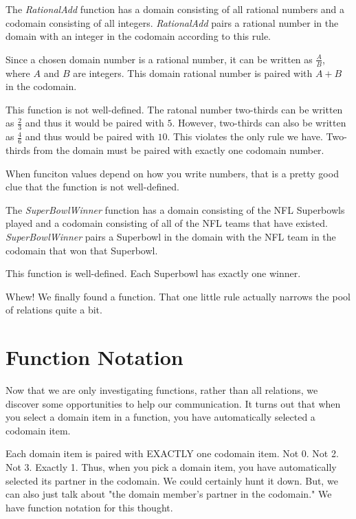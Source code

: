 \documentclass{ximera}
\begin{document}
\begin{example}
The \textit{RationalAdd} function has a domain consisting of all rational numbers and a codomain consisting of all integers.  \textit{RationalAdd} pairs a rational number in the domain with an integer in the codomain according to this rule.

Since a chosen domain number is a rational number, it can be written as $\tfrac{A}{B}$, where $A$ and $B$ are integers. This domain rational number is paired with $A+B$ in the codomain.

This function is not well-defined.  The ratonal number two-thirds can be written as $\tfrac{2}{3}$ and thus it would be paired with $5$.  However, two-thirds can also be written as $\tfrac{4}{6}$ and thus would be paired with $10$.  This violates the only rule we have.  Two-thirds from the domain must be paired with exactly one codomain number.

When funciton values depend on how you write numbers, that is a pretty good clue that the function is not well-defined.
\end{example}



\begin{example}
The \textit{SuperBowlWinner} function has a domain consisting of the NFL Superbowls played and a codomain consisting of all of the NFL teams that have existed.  \textit{SuperBowlWinner} pairs a Superbowl in the domain with the NFL team in the codomain that won that Superbowl. 

This function is well-defined. Each Superbowl has exactly one winner.
\end{example}

Whew!  We finally found a function. That one little rule actually narrows the pool of relations quite a bit.



\section{Function Notation}

Now that we are only investigating functions, rather than all relations, we discover some opportunities to help our communication.  It turns out that when you select a domain item in a function, you have automatically selected a codomain item.

Each domain item is paired with EXACTLY one codomain item.  Not 0. Not 2.  Not 3.  Exactly 1.  Thus, when you pick a domain item, you have automatically selected its partner in the codomain.  We could certainly hunt it down.  But, we can also just talk about "the domain member's partner in the codomain."  We have function notation for this thought.
\end{document}
